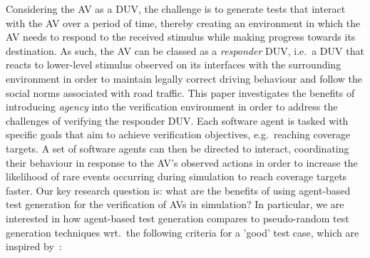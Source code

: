 \documentclass[letterpaper, 10 pt, journal, twoside]{IEEEtran}
\begin{document}
Considering the AV as a DUV, the challenge is to generate tests that interact with the AV over a period of time, thereby creating an environment in which the AV needs to respond to the received stimulus while making progress towards its destination. 
%
As such, the AV can be classed as a \textit{responder\/} DUV, i.e.\ a DUV that reacts to lower-level stimulus observed on its interfaces with the surrounding environment in order to maintain legally correct driving behaviour and follow the social norms associated with road traffic.
%
%
This paper investigates the benefits of introducing \textit{agency} into the verification environment in order to address the challenges of verifying the responder DUV. 
%
Each software agent is tasked with specific goals that aim to achieve verification objectives, e.g.\ reaching coverage targets.
%
A set of software agents can then be directed to interact, coordinating their behaviour in response to the AV's observed actions in order to increase the likelihood of rare events occurring during simulation to reach coverage targets faster.
%
Our key research question is: what are the benefits of using agent-based test generation for the verification of AVs in simulation?
%
In particular, we are interested in how agent-based test generation compares to pseudo-random test generation techniques wrt.\ the following criteria for a 'good' test case, which are inspired by~\cite{fewster1999software}:
\end{document}
